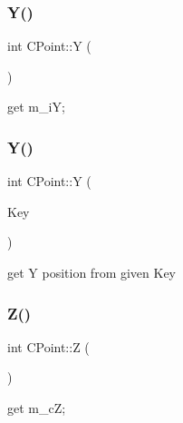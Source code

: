 \subsubsection{\texorpdfstring{Y()}{Y()}\hspace{0.1cm}{\footnotesize\ttfamily [1/2]}}
{\footnotesize\ttfamily int C\+Point\+::Y (\begin{DoxyParamCaption}{ }\end{DoxyParamCaption})\hspace{0.3cm}{\ttfamily [inline]}}



get m\+\_\+iY; 

\mbox{\label{classCPoint_a2760f11ef7f482c28c0385ef402faa9f}} 
\subsubsection{\texorpdfstring{Y()}{Y()}\hspace{0.1cm}{\footnotesize\ttfamily [2/2]}}
{\footnotesize\ttfamily int C\+Point\+::Y (\begin{DoxyParamCaption}\item[{\mbox{\hyperlink{res2dmp_8cpp_a8ae9d53f33f46cfcfcb9736e6351452a}{K\+EY}}}]{Key }\end{DoxyParamCaption})\hspace{0.3cm}{\ttfamily [static]}}



get Y position from given Key 

\mbox{\label{classCPoint_a6d03d17763a148af852d10a9a410167e}} 
\subsubsection{\texorpdfstring{Z()}{Z()}\hspace{0.1cm}{\footnotesize\ttfamily [1/2]}}
{\footnotesize\ttfamily int C\+Point\+::Z (\begin{DoxyParamCaption}{ }\end{DoxyParamCaption})\hspace{0.3cm}{\ttfamily [inline]}}



get m\+\_\+cZ; 

\mbox{\label{classCPoint_a896823777dbcd50cceec722a9fee6ddb}} 
